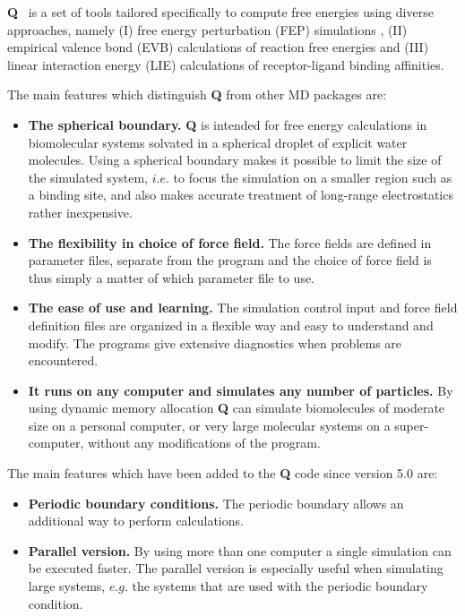 \documentclass[a4paper,10pt]{article}
\begin{document}
\textbf{Q}~\cite{Marelius:1999}   is   a   set   of   tools   tailored
specifically to compute free energies using diverse approaches, namely
(I)      free      energy     perturbation      (FEP)      simulations
\cite{Kollman:1993,Beveridge:1989}, (II) empirical  valence bond (EVB)
calculations   \cite{Warshel:1988,Aaqvist:1993}   of   reaction   free
energies    and     (III)    linear    interaction     energy    (LIE)
calculations\cite{Aaqvist:1994,Jones-Hertzog:1997,Hansson:1998}     of
receptor-ligand binding affinities.

The main features which distinguish  \textbf{Q} from other MD packages
are:
\begin{itemize}
\item \textbf{The spherical boundary.} \textbf{Q} is intended for free
  energy calculations in biomolecular  systems solvated in a spherical
  droplet  of explicit  water molecules.   Using a  spherical boundary
  \cite{Warshel:1978,Berkowitz:1982,Brunger:1984} makes it possible to
  limit  the  size  of  the  simulated system,  $i.e.$  to  focus  the
  simulation on  a smaller  region such  as a  binding site,  and also
  makes  accurate   treatment  of  long-range   electrostatics  rather
  inexpensive.
\item \textbf{The  flexibility in choice  of force field.}   The force
  fields are defined in parameter files, separate from the program and
  the choice of force field is thus simply a matter of which parameter
  file to use.
\item \textbf{The  ease of use  and learning.} The  simulation control
  input and force  field definition files are organized  in a flexible
  way and easy to understand  and modify.  The programs give extensive
  diagnostics when problems are encountered.
\item  \textbf{It runs  on any  computer and  simulates any  number of
  particles.}   By  using  dynamic memory  allocation  \textbf{Q}  can
  simulate biomolecules  of moderate size  on a personal  computer, or
  very  large  molecular  systems  on a  super-computer,  without  any
  modifications of the program.
\end{itemize}

The main features  which have been added to the  \textbf{Q} code since
version 5.0 are:

\begin{itemize}
\item \textbf{Periodic boundary conditions.} The periodic boundary
allows an additional way to perform calculations.

\item \textbf{Parallel version.} By using more than one computer a
single simulation can be executed faster. The parallel version is
especially useful when simulating large systems, $e.g.$ the
systems that are used with the periodic boundary condition.
\end{itemize}
\end{document}
